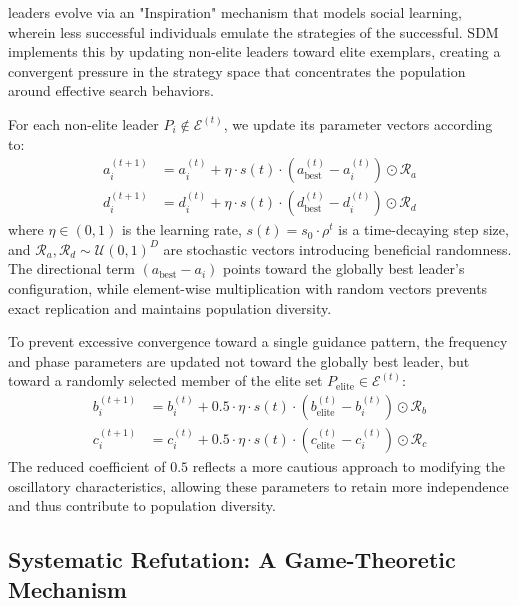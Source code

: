 \documentclass[11pt]{article}
\begin{document}
leaders evolve via an "Inspiration" mechanism that models social learning, wherein less successful individuals emulate the strategies of the successful. SDM implements this by updating non-elite leaders toward elite exemplars, creating a convergent pressure in the strategy space that concentrates the population around effective search behaviors.

For each non-elite leader $P_i \notin \mathcal{E}^{(t)}$, we update its parameter vectors according to:
\begin{align}
a_i^{(t+1)} &= a_i^{(t)} + \eta \cdot s(t) \cdot (a_{\text{best}}^{(t)} - a_i^{(t)}) \odot \mathcal{R}_a \label{eq:inspire_a} \\
d_i^{(t+1)} &= d_i^{(t)} + \eta \cdot s(t) \cdot (d_{\text{best}}^{(t)} - d_i^{(t)}) \odot \mathcal{R}_d \label{eq:inspire_d}
\end{align}
where $\eta \in (0,1)$ is the learning rate, $s(t) = s_0 \cdot \rho^t$ is a time-decaying step size, and $\mathcal{R}_a, \mathcal{R}_d \sim \mathcal{U}(0,1)^D$ are stochastic vectors introducing beneficial randomness. The directional term $(a_{\text{best}} - a_i)$ points toward the globally best leader's configuration, while element-wise multiplication with random vectors prevents exact replication and maintains population diversity.

To prevent excessive convergence toward a single guidance pattern, the frequency and phase parameters are updated not toward the globally best leader, but toward a randomly selected member of the elite set $P_{\text{elite}} \in \mathcal{E}^{(t)}$:
\begin{align}
b_i^{(t+1)} &= b_i^{(t)} + 0.5 \cdot \eta \cdot s(t) \cdot (b_{\text{elite}}^{(t)} - b_i^{(t)}) \odot \mathcal{R}_b \\
c_i^{(t+1)} &= c_i^{(t)} + 0.5 \cdot \eta \cdot s(t) \cdot (c_{\text{elite}}^{(t)} - c_i^{(t)}) \odot \mathcal{R}_c
\end{align}
The reduced coefficient of $0.5$ reflects a more cautious approach to modifying the oscillatory characteristics, allowing these parameters to retain more independence and thus contribute to population diversity.

\subsection{Systematic Refutation: A Game-Theoretic Mechanism}

\end{document}
